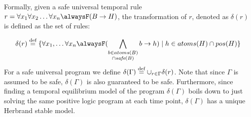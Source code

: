 Formally, given a safe universal temporal rule
$r=\forallx \alwaysF(B \rightarrow H)$, the
transformation of $r$, denoted as $\delta(r)$ is defined as the set of
rules:

\begin{equation*} \delta(r) \defeq \{ \forall x_1, \dots \forall x_n
  \alwaysF(\bigwedge_{\substack{b \in atoms(B)\\ \cap \safe{B}}}b
  \rightarrow h) \mid h \in atoms(H) \cap pos(H)\}
\end{equation*}
For a safe universal program we define
$\delta (\Gamma) \stackrel{\text{def}}{=} \cup_{r \in \Gamma} \delta(r)$. Note that
since $\Gamma$ is assumed to be safe, $\delta(\Gamma)$ is also
guaranteed to be safe. Furthermore, since finding a temporal
equilibrium model of the program $\delta(\Gamma)$ boils down to just
solving the same positive logic program at each time point,
$\delta(\Gamma)$ has a unique Herbrand stable model.

